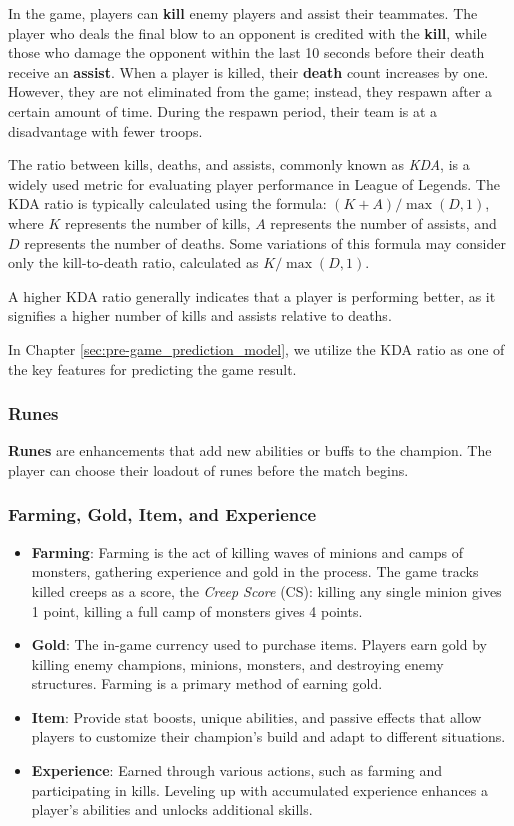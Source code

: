\documentclass[11pt,a4paper,oneside]{report}
\begin{document}
In the game, players can \textbf{kill} enemy players and assist their teammates. The player who deals the final blow to an opponent is credited with the \textbf{kill}, while those who damage the opponent within the last 10 seconds before their death receive an \textbf{assist}. When a player is killed, their \textbf{death} count increases by one. However, they are not eliminated from the game; instead, they respawn after a certain amount of time. During the respawn period, their team is at a disadvantage with fewer troops.



The ratio between kills, deaths, and assists, commonly known as \textit{KDA}, is a widely used metric for evaluating player performance in League of Legends. The KDA ratio is typically calculated using the formula: $(K + A) / \max(D, 1)$, where $K$ represents the number of kills, $A$ represents the number of assists, and $D$ represents the number of deaths. Some variations of this formula may consider only the kill-to-death ratio, calculated as $K / \max(D, 1)$.

A higher KDA ratio generally indicates that a player is performing better, as it signifies a higher number of kills and assists relative to deaths.

In Chapter \ref{sec:pre-game_prediction_model}, we utilize the KDA ratio as one of the key features for predicting the game result.

\subsubsection{Runes}

\textbf{Runes} are enhancements that add new abilities or buffs to the champion. The player can choose their loadout of runes before the match begins\cite{league-wiki-rune}.

\subsubsection{Farming, Gold, Item, and Experience}

\begin{itemize}
  \item \textbf{Farming}: Farming is the act of killing waves of minions and camps of monsters, gathering experience and gold in the process. The game tracks killed creeps as a score, the \textit{Creep Score} (CS): killing any single minion gives 1 point, killing a full camp of monsters gives 4 points.
  \item \textbf{Gold}: The in-game currency used to purchase items. Players earn gold by killing enemy champions, minions, monsters, and destroying enemy structures. Farming is a primary method of earning gold.
  \item \textbf{Item}: Provide stat boosts, unique abilities, and passive effects that allow players to customize their champion's build and adapt to different situations.
  \item \textbf{Experience}: Earned through various actions, such as farming and participating in kills. Leveling up with accumulated experience enhances a player's abilities and unlocks additional skills.
\end{itemize}
\end{document}
